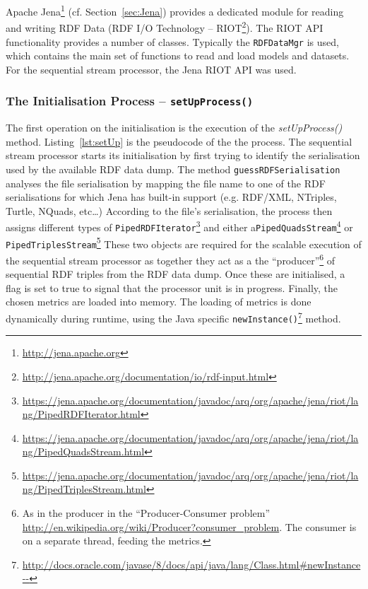 Apache Jena\footnote{\url{http://jena.apache.org}} (cf. Section~\ref{sec:Jena}) provides a dedicated module for reading and writing RDF Data (RDF I/O Technology – RIOT\footnote{\url{http://jena.apache.org/documentation/io/rdf-input.html}}).
The RIOT API functionality provides a number of classes.
Typically the \texttt{RDFDataMgr} is used, which contains the main set of functions to read and load models and datasets.
For the sequential stream processor, the Jena RIOT API was used.

\subsubsection{The Initialisation Process – \texttt{setUpProcess()}}
The first operation on the initialisation is the execution of the \emph{setUpProcess()} method.
Listing~\ref{lst:setUp} is the pseudocode of the the process.
The sequential stream processor starts its initialisation by first trying to identify the serialisation used by the available RDF data dump.
The method \texttt{guessRDFSerialisation} analyses the file serialisation by mapping the file name to one of the RDF serialisations for which Jena has built-in support (e.g. RDF/XML, NTriples, Turtle, NQuads, etc\dots)
According to the file's serialisation, the process then assigns different types of \texttt{PipedRDFIterator}\footnote{\url{https://jena.apache.org/documentation/javadoc/arq/org/apache/jena/riot/lang/PipedRDFIterator.html}} and either a\texttt{PipedQuadsStream}\footnote{\url{https://jena.apache.org/documentation/javadoc/arq/org/apache/jena/riot/lang/PipedQuadsStream.html}} or \texttt{PipedTriplesStream}\footnote{\url{https://jena.apache.org/documentation/javadoc/arq/org/apache/jena/riot/lang/PipedTriplesStream.html}} 
These two objects are required for the scalable execution of the sequential stream processor as together they act as a the ``producer''\footnote{As in the producer in the ``Producer-Consumer problem'' \url{http://en.wikipedia.org/wiki/Producer?consumer_problem}. The consumer is on a separate thread, feeding the metrics.} of sequential RDF triples from the RDF data dump.
Once these are initialised, a flag is set to true to signal that the processor unit is in progress.
Finally, the chosen metrics are loaded into memory.
The loading of metrics is done dynamically during runtime, using the Java specific \texttt{newInstance()}\footnote{\url{http://docs.oracle.com/javase/8/docs/api/java/lang/Class.html#newInstance--}} method. 

